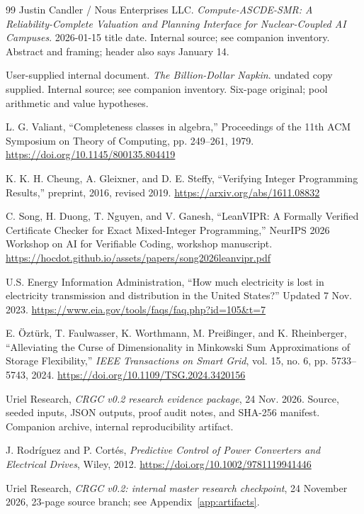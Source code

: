 \documentclass[11pt,letterpaper]{article}
\begin{document}
\begin{thebibliography}{99}
 Justin Candler / Nous Enterprises LLC. \emph{Compute-ASCDE-SMR: A Reliability-Complete Valuation and Planning Interface for Nuclear-Coupled AI Campuses}. 2026-01-15 title date. Internal source; see companion inventory. Abstract and framing; header also says January 14.

 User-supplied internal document. \emph{The Billion-Dollar Napkin}. undated copy supplied. Internal source; see companion inventory. Six-page original; pool arithmetic and value hypotheses.


 L. G. Valiant, ``Completeness classes in algebra,'' Proceedings of the 11th ACM Symposium on Theory of Computing, pp. 249--261, 1979. \url{https://doi.org/10.1145/800135.804419}

 K. K. H. Cheung, A. Gleixner, and D. E. Steffy, ``Verifying Integer Programming Results,'' preprint, 2016, revised 2019. \url{https://arxiv.org/abs/1611.08832}

 C. Song, H. Duong, T. Nguyen, and V. Ganesh, ``LeanVIPR: A Formally Verified Certificate Checker for Exact Mixed-Integer Programming,'' NeurIPS 2026 Workshop on AI for Verifiable Coding, workshop manuscript. \url{https://hocdot.github.io/assets/papers/song2026leanvipr.pdf}

 U.S. Energy Information Administration, ``How much electricity is lost in electricity transmission and distribution in the United States?'' Updated 7 Nov. 2023. \url{https://www.eia.gov/tools/faqs/faq.php?id=105&t=7}

 E. \"Ozt\"urk, T. Faulwasser, K. Worthmann, M. Prei\ss inger, and K. Rheinberger, ``Alleviating the Curse of Dimensionality in Minkowski Sum Approximations of Storage Flexibility,'' \emph{IEEE Transactions on Smart Grid}, vol. 15, no. 6, pp. 5733--5743, 2024. \url{https://doi.org/10.1109/TSG.2024.3420156}

 Uriel Research, \emph{CRGC v0.2 research evidence package}, 24 Nov. 2026. Source, seeded inputs, JSON outputs, proof audit notes, and SHA-256 manifest. Companion archive, internal reproducibility artifact.

 J. Rodr\'iguez and P. Cort\'es, \emph{Predictive Control of Power Converters and Electrical Drives}, Wiley, 2012. \url{https://doi.org/10.1002/9781119941446}

 Uriel Research, \emph{CRGC v0.2: internal master research checkpoint}, 24 November 2026, 23-page source branch; see Appendix~\ref{app:artifacts}.


\end{thebibliography}
\end{document}
